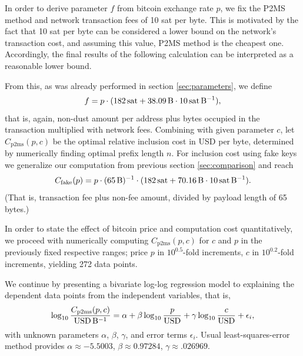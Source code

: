 \documentclass[a4paper,11pt,titlepage]{scrbook}
\begin{document}
In order to derive parameter $f$ from bitcoin exchange rate $p$, we fix the P2MS method and network transaction fees of 10 sat per byte.
%
%
This is motivated by the fact that 10 sat per byte can be considered a lower bound on the network's transaction cost, and assuming this value, P2MS method is the cheapest one.
Accordingly, the final results of the following calculation can be interpreted as a reasonable lower bound.

From this, as was already performed in section \ref{sec:parameters}, we define \[f = p \cdot (182\,\text{sat} + \SI{38.09}{\byte}\cdot 10\,\text{sat}\,\si{\per\byte}),\] that is, again, non-dust amount per address plus bytes occupied in the transaction multiplied with network fees.
Combining with given parameter $c$, let $C_\text{p2ms}(p,c)$ be the optimal relative inclusion cost in USD per byte, determined by numerically finding optimal prefix length $n$.
For inclusion cost using fake keys we generalize our computation from previous section \ref{sec:comparison} and reach \[ C_\text{fake}(p) = p \cdot (\SI{65}{\byte})^{-1} \cdot (182\,\text{sat} + \SI{70.16}{\byte}\cdot 10\,\text{sat}\,\si{\per\byte}).\] (That is, transaction fee plus non-fee amount, divided by payload length of 65 bytes.)

In order to state the effect of bitcoin price and computation cost quantitatively, we proceed with numerically computing $C_\text{p2ms}(p,c)$ for $c$ and $p$ in the previously fixed respective ranges; price $p$ in $10^{0.5}$-fold increments, $c$ in $10^{0.2}$-fold increments, yielding 272 data points.

We continue by presenting a bivariate log-log regression model to explaining the dependent data points from the independent variables, that is,
\begin{equation} \log_{10} \frac{C_\text{p2ms}(p, c)}{\text{USD}\,\si{\per\byte}} = \alpha + \beta \log_{10} \frac{p}{\text{USD}} + \gamma \log_{10} \frac{c}{\text{USD}} + \epsilon_i, \label{eq:regressionmodel}\end{equation}
with unknown parameters $\alpha$, $\beta$, $\gamma$, and error terms $\epsilon_i$.
Usual least-squares-error method provides $\alpha \approx \num{-5.5003}$, $\beta \approx\num{0.97284}$, $\gamma \approx\num{.026969}$.
\end{document}
